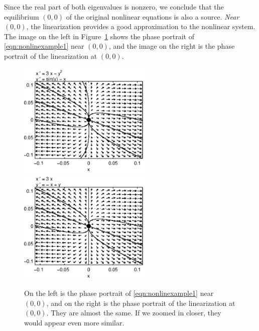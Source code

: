 \begin{xexample}
Since the real part of both eigenvalues is nonzero,
we conclude that the equilibrium $(0,0)$ of the original
nonlinear equations is also a source.
\emph{Near $(0,0)$}, the linearization provides a
good approximation to the nonlinear system.
The image on the left in Figure~\ref{fig:nonlinexample1compare}
shows the phase portrait of \eqref{eqn:nonlinexample1}
near $(0,0)$, and the image on the right
is the phase portrait of the linearization at $(0,0)$.
\begin{figure}
\centerline{%
\includegraphics[width=2.5in]{pplane_plots/NonlinExample1detail.ps}
\includegraphics[width=2.5in]{pplane_plots/NonlinExample1lin.ps}
}
\caption{On the left is the phase portrait of
\eqref{eqn:nonlinexample1} near $(0,0)$, and on the
right is the phase portrait of the linearization
at $(0,0)$.  They are almost the same.  If we zoomed
in closer, they would appear even more similar.}
\label{fig:nonlinexample1compare}
\end{figure}
\end{xexample}
%
%
